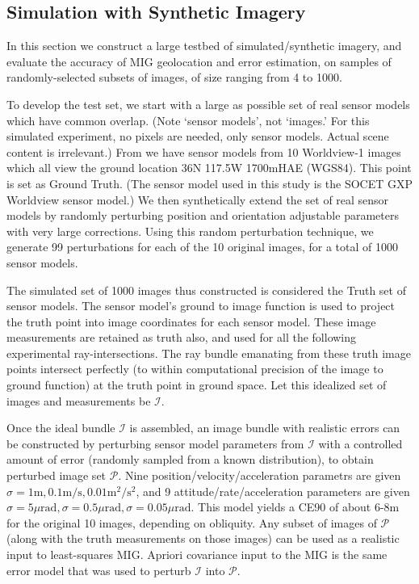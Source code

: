 \documentclass[10pt]{amsart}
\newcommand{\Iimg}{\mathcal{I}}
\newcommand{\Pimg}{\mathcal{P}}
\begin{document}
\subsection{\label{simulation}Simulation with Synthetic Imagery}
In this section we construct a large testbed of simulated/\-syn\-the\-tic imagery, and
evaluate the accuracy of MIG geolocation and error estimation, on samples of
randomly-selected subsets of images, of size ranging from 4 to 1000.

To develop the test set, we start with a large as possible set of real sensor
models which have common overlap. (Note `sensor models', not `images.' For
this simulated experiment, no pixels are needed, only sensor models. Actual
scene content is irrelevant.)  From \cite{MIN} we have sensor models from 10
Worldview-1 images which all view the ground location 36N 117.5W 1700mHAE
(WGS84). This point is set as Ground Truth. (The sensor model used in this study
is the SOCET GXP \cite{SGXP} Worldview sensor model.) We then synthetically
extend the set of real sensor models by randomly perturbing position and
orientation adjustable parameters with very large corrections. Using this random
perturbation technique, we generate 99 perturbations for each of the 10
original images, for a total of 1000 sensor models.

The simulated set of 1000 images thus constructed is considered the Truth set of
sensor models. The sensor model's ground to image function is used to project
the truth point into image coordinates for each sensor model. These image
measurements are retained as truth also, and used for all the following
experimental ray-intersections. The ray bundle emanating from these truth image
points intersect perfectly (to within computational precision of the image to
ground function) at the truth point in ground space. Let this idealized set of
images and measurements be $\Iimg$.

Once the ideal bundle $\Iimg$ is assembled, an image bundle with realistic
errors can be constructed by perturbing sensor model parameters from $\Iimg$ with a
controlled amount of error (randomly sampled from a known distribution), to
obtain perturbed image set $\Pimg$. Nine position/velocity/ac\-cel\-eration
parametrs are given $\sigma = 1{\mathrm m}, 0.1{\mathrm m}/{\mathrm s},
0.01{\mathrm m}^2/{\mathrm s}^2$, and 9 attitude/rate/acceleration parameters
are given
$\sigma=5\mu\mathrm{rad}, \sigma=0.5\mu\mathrm{rad}, \sigma=0.05\mu\mathrm{rad}$.
This model yields a CE90 of about 6-8m for the original 10 images, depending
on obliquity. Any subset of images of $\Pimg$ (along with the truth measurements
on those images) can be used as a realistic input to least-squares MIG. Apriori
covariance input to the MIG is the same error model that was used to perturb
$\Iimg$ into $\Pimg$.
\end{document}
